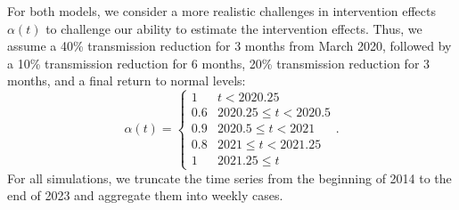 \documentclass[12pt]{article}
\begin{document}
For both models, we consider a more realistic challenges in intervention effects $\alpha(t)$ to challenge our ability to estimate the intervention effects.
Thus, we assume a 40\% transmission reduction for 3 months from March 2020, followed by a 10\% transmission reduction for 6 months, 20\% transmission reduction for 3 months, and a final return to normal levels:
\begin{equation}
\alpha(t) = \begin{cases}
1 & t < 2020.25\\
0.6 & 2020.25 \leq t < 2020.5\\
0.9 & 2020.5 \leq t < 2021\\
0.8 & 2021 \leq t < 2021.25\\
1 & 2021.25 \leq t
\end{cases}.
\end{equation}
For all simulations, we truncate the time series from the beginning of 2014 to the end of 2023 and aggregate them into weekly cases.
\end{document}
